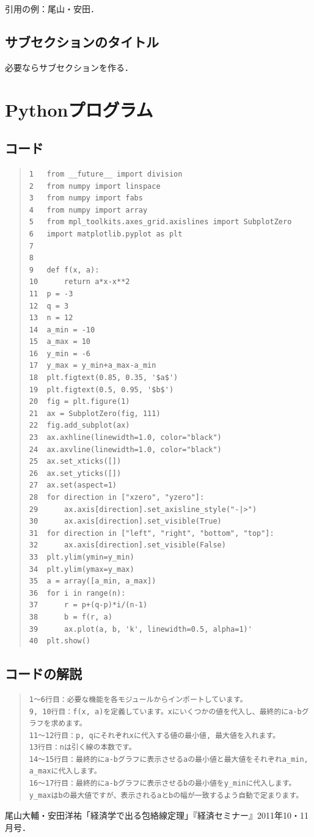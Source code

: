 \documentclass[11pt,a4j,fleqn]{jarticle}
\begin{document}
引用の例：尾山・安田\cite{OyamaYasuda11}．


\subsection{サブセクションのタイトル}

必要ならサブセクションを作る．


\newpage
\section{Pythonプログラム}
\subsection{コード}
\begin{quote}
\begin{verbatim}
1  	from __future__ import division
2  	from numpy import linspace
3  	from numpy import fabs
4  	from numpy import array
5  	from mpl_toolkits.axes_grid.axislines import SubplotZero
6  	import matplotlib.pyplot as plt
7  	
8  	
9  	def f(x, a):
10 	    return a*x-x**2
11 	p = -3
12 	q = 3
13 	n = 12
14 	a_min = -10
15 	a_max = 10
16 	y_min = -6
17 	y_max = y_min+a_max-a_min
18 	plt.figtext(0.85, 0.35, '$a$')
19 	plt.figtext(0.5, 0.95, '$b$')
20 	fig = plt.figure(1)
21 	ax = SubplotZero(fig, 111)
22 	fig.add_subplot(ax)
23 	ax.axhline(linewidth=1.0, color="black")
24 	ax.axvline(linewidth=1.0, color="black")
25 	ax.set_xticks([])
26 	ax.set_yticks([])
27 	ax.set(aspect=1)
28 	for direction in ["xzero", "yzero"]:
29 	    ax.axis[direction].set_axisline_style("-|>")
30 	    ax.axis[direction].set_visible(True)
31 	for direction in ["left", "right", "bottom", "top"]:
32 	    ax.axis[direction].set_visible(False)
33 	plt.ylim(ymin=y_min)
34 	plt.ylim(ymax=y_max)
35 	a = array([a_min, a_max])
36 	for i in range(n):
37 	    r = p+(q-p)*i/(n-1)
38 	    b = f(r, a)
39 	    ax.plot(a, b, 'k', linewidth=0.5, alpha=1)'
40 	plt.show()
\end{verbatim}
\end{quote}

\subsection{コードの解説}
\begin{quote}
\begin{verbatim}
1～6行目：必要な機能を各モジュールからインポートしています。
9, 10行目：f(x, a)を定義しています。xにいくつかの値を代入し、最終的にa-bグラフを求めます。
11～12行目：p, qにそれぞれxに代入する値の最小値, 最大値を入れます。
13行目：nは引く線の本数です。
14～15行目：最終的にa-bグラフに表示させるaの最小値と最大値をそれぞれa_min, a_maxに代入します。
16～17行目：最終的にa-bグラフに表示させるbの最小値をy_minに代入します。y_maxはbの最大値ですが、表示されるaとbの幅が一致するよう自動で定まります。
\end{verbatim}
\end{quote}


\begin{thebibliography}{0}
尾山大輔・安田洋祐「経済学で出る包絡線定理」『経済セミナー』2011年10・11月号．
\end{thebibliography}
\end{document}
